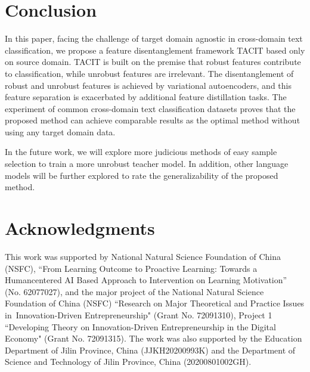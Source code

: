 \documentclass[letterpaper]{article} %
\begin{document}
\section{Conclusion}
In this paper, facing the challenge of target domain agnostic in cross-domain text classification, we propose a feature disentanglement framework TACIT based only on source domain. TACIT is built on the premise that robust features contribute to classification, while unrobust features are irrelevant. The disentanglement of robust and unrobust features is achieved by variational autoencoders, and this feature separation is exacerbated by additional feature distillation tasks. The experiment of common cross-domain text classification datasets proves that the proposed method can achieve comparable results as the optimal method without using any target domain data.

In the future work, we will explore more judicious methods of easy sample selection to train a more unrobust teacher model. In addition, other language models will be further explored to rate the generalizability of the proposed method.

\clearpage
\section{Acknowledgments}
This work was supported by National Natural Science Foundation of China (NSFC), ``From Learning Outcome to Proactive Learning: Towards a Humancentered AI Based Approach to Intervention on Learning Motivation” (No. 62077027), and the major project of the National Natural Science Foundation of China (NSFC) ``Research on Major Theoretical and Practice Issues in Innovation-Driven Entrepreneurship" (Grant No. 72091310), Project 1 ``Developing Theory on Innovation-Driven Entrepreneurship in the Digital Economy" (Grant No. 72091315). The work was also supported by the Education Department of Jilin Province, China (JJKH20200993K) and the Department of Science and Technology of Jilin Province, China (20200801002GH).
\end{document}
